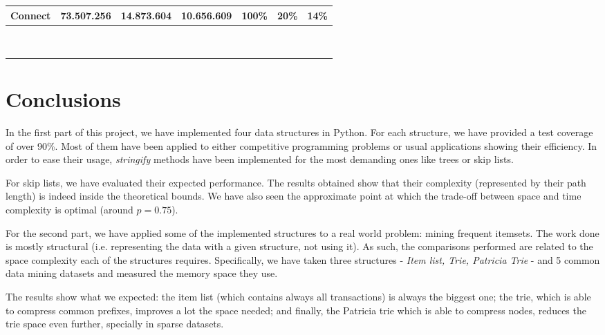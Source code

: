 \documentclass[a4paper,10pt,table,xcdraw]{article}
\begin{document}
\begin{table}[h]
\begin{tabular}{lllllll}
\multicolumn{1}{|l|}{\cellcolor[HTML]{DAE8FC}Connect} & \multicolumn{1}{c|}{73.507.256} & \multicolumn{1}{c|}{14.873.604} & \multicolumn{1}{c|}{10.656.609} & \multicolumn{1}{c|}{100\%} & \multicolumn{1}{c|}{20\%} & \multicolumn{1}{c|}{14\%} \\ \hline
 &  &  &  &  &  &  \\
 &  &  &  &  &  &  \\
 &  &  &  &  &  &  \\
 &  &  &  &  &  &  \\
 &  &  &  &  &  &  \\
 &  &  &  &  &  &  \\
 &  &  &  &  &  &  \\
 &  &  &  &  &  &  \\
 &  &  &  &  &  & 
\end{tabular}
\end{table}




\section{Conclusions}
\label{sec:conclusions}

In the first part of this project, we have implemented four data structures in Python. For each structure, we have provided a test coverage of over 90\%. Most of them have been applied to either competitive programming problems or usual applications showing their efficiency. In order to ease their usage, \textit{stringify} methods have been implemented for the most demanding ones like trees or skip lists. 

For skip lists, we have evaluated their expected performance. The results obtained show that their complexity (represented by their path length) is indeed inside the theoretical bounds. We have also seen the approximate point at which the trade-off between space and time complexity is optimal (around $p=0.75$).

For the second part, we have applied some of the implemented structures to a real world problem: mining frequent itemsets. The work done is mostly structural (i.e. representing the data with a given structure, not using it). As such, the comparisons performed are related to the space complexity each of the structures requires. Specifically, we have taken three structures - \textit{Item list, Trie, Patricia Trie} - and 5 common data mining datasets and measured the memory space they use.

The results show what we expected: the item list (which contains always all transactions) is always the biggest one; the trie, which is able to compress common prefixes, improves a lot the space needed; and finally, the Patricia trie which is able to compress nodes, reduces the trie space even further, specially in sparse datasets.
\end{document}
